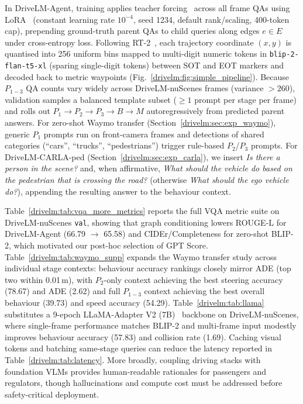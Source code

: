 In DriveLM-Agent, training applies teacher forcing~\cite{lamb2016professor,toomarian1992learning} across all frame QAs using LoRA~\cite{hu2021lora} (constant learning rate $10^{-4}$, seed 1234, default rank/scaling, 400-token cap), prepending ground-truth parent QAs to child queries along edges $e\in E$ under cross-entropy loss. Following RT-2~\cite{zitkovich2023rt2}, each trajectory coordinate $(x,y)$ is quantised into 256 uniform bins mapped to multi-digit numeric tokens in \texttt{blip-2-flan-t5-xl} (sparing single-digit tokens) between SOT and EOT markers and decoded back to metric waypoints (Fig.~\ref{drivelm:fig:simple_pipeline}). Because $P_{1-3}$ QA counts vary widely across DriveLM-nuScenes frames (variance $>260$), validation samples a balanced template subset ($\ge 1$ prompt per stage per frame) and rolls out $P_1 \rightarrow P_2 \rightarrow P_3 \rightarrow B \rightarrow M$ autoregressively from predicted parent answers. For zero-shot Waymo transfer (Section~\ref{drivelm:sec:exp_waymo}), generic $P_1$ prompts run on front-camera frames and detections of shared categories (``cars'', ``trucks'', ``pedestrians'') trigger rule-based $P_2$/$P_3$ prompts. For DriveLM-CARLA-ped (Section~\ref{drivelm:sec:exp_carla}), we insert \emph{Is there a person in the scene?} and, when affirmative, \emph{What should the vehicle do based on the pedestrian that is crossing the road?} (otherwise \emph{What should the ego vehicle do?}), appending the resulting answer to the behaviour context.

Table~\ref{drivelm:tab:vqa_more_metrics} reports the full VQA metric suite on DriveLM-nuScenes \texttt{val}, showing that graph conditioning lowers ROUGE-L for DriveLM-Agent (66.79 $\rightarrow$ 65.58) and CIDEr/Completeness for zero-shot BLIP-2, which motivated our post-hoc selection of GPT Score. Table~\ref{drivelm:tab:waymo_supp} expands the Waymo transfer study across individual stage contexts: behaviour accuracy rankings closely mirror ADE (top two within 0.01\,m), with $P_2$-only context achieving the best steering accuracy (78.67) and ADE (2.62) and full $P_{1-3}$ context achieving the best overall behaviour (39.73) and speed accuracy (54.29). Table~\ref{drivelm:tab:llama} substitutes a 9-epoch LLaMA-Adapter V2 (7B)~\cite{gao2023llamaadapterv2} backbone on DriveLM-nuScenes, where single-frame performance matches BLIP-2 and multi-frame input modestly improves behaviour accuracy (57.83) and collision rate (1.69). Caching visual tokens and batching same-stage queries can reduce the latency reported in Table~\ref{drivelm:tab:latency}. More broadly, coupling driving stacks with foundation VLMs provides human-readable rationales for passengers and regulators, though hallucinations and compute cost must be addressed before safety-critical deployment.

